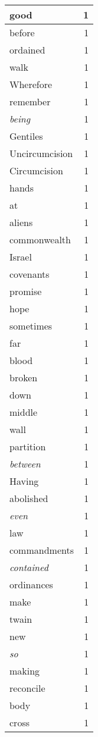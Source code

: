 \begin{center}
\begin{longtable}{l|r}
good & 1\\ \hline 
before & 1\\ \hline 
ordained & 1\\ \hline 
walk & 1\\ \hline 
Wherefore & 1\\ \hline 
remember & 1\\ \hline 
\emph{being} & 1\\ \hline 
Gentiles & 1\\ \hline 
Uncircumcision & 1\\ \hline 
Circumcision & 1\\ \hline 
hands & 1\\ \hline 
at & 1\\ \hline 
aliens & 1\\ \hline 
commonwealth & 1\\ \hline 
Israel & 1\\ \hline 
covenants & 1\\ \hline 
promise & 1\\ \hline 
hope & 1\\ \hline 
sometimes & 1\\ \hline 
far & 1\\ \hline 
blood & 1\\ \hline 
broken & 1\\ \hline 
down & 1\\ \hline 
middle & 1\\ \hline 
wall & 1\\ \hline 
partition & 1\\ \hline 
\emph{between} & 1\\ \hline 
Having & 1\\ \hline 
abolished & 1\\ \hline 
\emph{even} & 1\\ \hline 
law & 1\\ \hline 
commandments & 1\\ \hline 
\emph{contained} & 1\\ \hline 
ordinances & 1\\ \hline 
make & 1\\ \hline 
twain & 1\\ \hline 
new & 1\\ \hline 
\emph{so} & 1\\ \hline 
making & 1\\ \hline 
reconcile & 1\\ \hline 
body & 1\\ \hline 
cross & 1\\ \hline 

\end{longtable}
\end{center}
